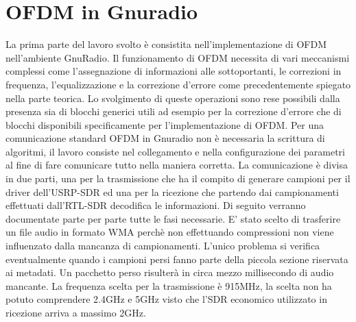 \chapter{OFDM in Gnuradio}
\label{cha:789}
La prima parte del lavoro svolto è consistita nell'implementazione di OFDM nell'ambiente GnuRadio. Il funzionamento di OFDM necessita di vari meccanismi complessi come l'assegnazione di informazioni alle sottoportanti, le correzioni in frequenza, l'equalizzazione e la correzione d'errore come precedentemente spiegato nella parte teorica. Lo svolgimento di queste operazioni sono rese possibili dalla presenza sia di blocchi generici utili ad esempio per la correzione d'errore che di blocchi disponibili specificamente per l'implementazione di OFDM. Per una comunicazione standard OFDM in Gnuradio non è necessaria la scrittura di algoritmi, il lavoro consiste nel collegamento e nella configurazione dei parametri al fine di fare comunicare tutto nella maniera corretta.
La comunicazione è divisa in due parti, una per la trasmissione che ha il compito di generare campioni per il driver dell'USRP-SDR ed una per la ricezione che partendo dai campionamenti effettuati dall'RTL-SDR decodifica le informazioni. Di seguito verranno documentate parte per parte tutte le fasi necessarie.
E' stato scelto di trasferire un file audio in formato WMA perchè non effettuando compressioni non viene influenzato dalla mancanza di campionamenti. L'unico problema si verifica eventualmente quando i campioni persi fanno parte della piccola sezione riservata ai metadati. Un pacchetto perso risulterà in circa mezzo millisecondo di audio mancante. La frequenza scelta per la trasmissione è 915MHz, la scelta non ha potuto comprendere 2.4GHz e 5GHz visto che l'SDR economico utilizzato in ricezione arriva a massimo 2GHz.
